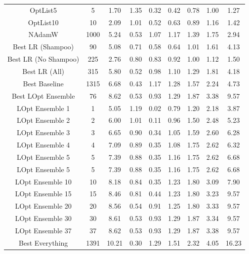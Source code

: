 \begin{tabular}{||c c c c c c c c c||}
\hline
OptList5 & 5 &1.70 & 1.35 & 0.32 & 0.42 & 0.78 & 1.00 & 1.27 \\
OptList10 & 10 &2.09 & 1.01 & 0.52 & 0.63 & 0.89 & 1.16 & 1.42 \\
\hline
NAdamW & 1000 &5.24 & 0.53 & 1.07 & 1.17 & 1.39 & 1.75 & 2.94 \\
\hline
Best LR (Shampoo) & 90 &5.08 & 0.71 & 0.58 & 0.64 & 1.01 & 1.61 & 4.13 \\
Best LR (No Shampoo) & 225 &2.76 & 0.80 & 0.83 & 0.92 & 1.00 & 1.12 & 1.50 \\
Best LR (All) & 315 &5.80 & 0.52 & 0.98 & 1.10 & 1.29 & 1.81 & 4.18 \\
\hline
Best Baseline & 1315 &6.68 & 0.43 & 1.17 & 1.28 & 1.57 & 2.24 & 4.73 \\
\hline
Best LOpt Ensemble & 76 &8.62 & 0.53 & 0.93 & 1.29 & 1.87 & 3.38 & 9.57 \\
\hline
LOpt Ensemble 1 & 1 &5.05 & 1.19 & 0.02 & 0.79 & 1.20 & 2.18 & 3.87 \\
LOpt Ensemble 2 & 2 &6.00 & 1.01 & 0.11 & 0.96 & 1.50 & 2.48 & 5.23 \\
LOpt Ensemble 3 & 3 &6.65 & 0.90 & 0.34 & 1.05 & 1.59 & 2.60 & 6.28 \\
LOpt Ensemble 4 & 4 &7.09 & 0.89 & 0.35 & 1.08 & 1.75 & 2.62 & 6.32 \\
LOpt Ensemble 5 & 5 &7.39 & 0.88 & 0.35 & 1.16 & 1.75 & 2.62 & 6.68 \\
LOpt Ensemble 5 & 5 &7.39 & 0.88 & 0.35 & 1.16 & 1.75 & 2.62 & 6.68 \\
LOpt Ensemble 10 & 10 &8.18 & 0.84 & 0.35 & 1.23 & 1.80 & 3.09 & 7.90 \\
LOpt Ensemble 15 & 15 &8.46 & 0.81 & 0.44 & 1.23 & 1.80 & 3.23 & 9.57 \\
LOpt Ensemble 20 & 20 &8.56 & 0.54 & 0.91 & 1.25 & 1.80 & 3.33 & 9.57 \\
LOpt Ensemble 30 & 30 &8.61 & 0.53 & 0.93 & 1.29 & 1.87 & 3.34 & 9.57 \\
LOpt Ensemble 37 & 37 &8.62 & 0.53 & 0.93 & 1.29 & 1.87 & 3.38 & 9.57 \\
\hline
Best Everything & 1391 &10.21 & 0.30 & 1.29 & 1.51 & 2.32 & 4.05 & 16.23 \\
\hline

\end{tabular}